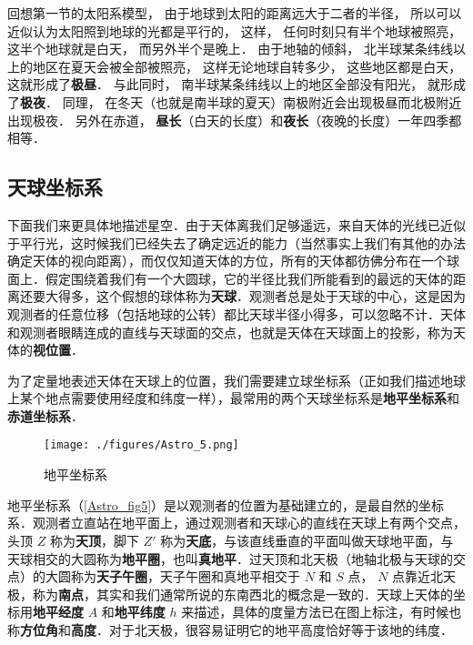回想第一节的太阳系模型， 由于地球到太阳的距离远大于二者的半径， 所以可以近似认为太阳照到地球的光都是平行的， %
这样， 任何时刻只有半个地球被照亮， 这半个地球就是白天， 而另外半个是晚上． 由于地轴的倾斜， 北半球某条纬线以上的地区在夏天会被全部被照亮， 这样无论地球自转多少， 这些地区都是白天， 这就形成了\textbf{极昼}． 与此同时， 南半球某条纬线以上的地区全部没有阳光， 就形成了\textbf{极夜}． 同理， 在冬天（也就是南半球的夏天）南极附近会出现极昼而北极附近出现极夜． 另外在赤道， \textbf{昼长}（白天的长度）和\textbf{夜长}（夜晚的长度）一年四季都相等．

\subsection{天球坐标系}

下面我们来更具体地描述星空．由于天体离我们足够遥远，来自天体的光线已近似于平行光，这时候我们已经失去了确定远近的能力（当然事实上我们有其他的办法确定天体的视向距离），而仅仅知道天体的方位，所有的天体都彷佛分布在一个球面上．假定围绕着我们有一个大圆球，它的半径比我们所能看到的最远的天体的距离还要大得多，这个假想的球体称为\textbf{天球}．观测者总是处于天球的中心，这是因为观测者的任意位移（包括地球的公转）都比天球半径小得多，可以忽略不计．天体和观测者眼睛连成的直线与天球面的交点，也就是天体在天球面上的投影，称为天体的\textbf{视位置}．

为了定量地表述天体在天球上的位置，我们需要建立球坐标系（正如我们描述地球上某个地点需要使用经度和纬度一样），最常用的两个天球坐标系是\textbf{地平坐标系}和\textbf{赤道坐标系}．

\begin{figure}[ht]
\centering
\texttt{[image: ./figures/Astro\_5.png]}
\caption{地平坐标系} \label{Astro_fig5}
\end{figure}

地平坐标系（\autoref{Astro_fig5}）是以观测者的位置为基础建立的，是最自然的坐标系．观测者立直站在地平面上，通过观测者和天球心的直线在天球上有两个交点，头顶 $Z$ 称为\textbf{天顶}，脚下 $Z'$ 称为\textbf{天底}，与该直线垂直的平面叫做天球地平面，与天球相交的大圆称为\textbf{地平圈}，也叫\textbf{真地平}．过天顶和北天极（地轴北极与天球的交点）的大圆称为\textbf{天子午圈}，天子午圈和真地平相交于 $N$ 和 $S$ 点， $N$ 点靠近北天极，称为\textbf{南点}，其实和我们通常所说的东南西北的概念是一致的．天球上天体的坐标用\textbf{地平经度} $A$ 和\textbf{地平纬度} $h$ 来描述，具体的度量方法已在图上标注，有时候也称\textbf{方位角}和\textbf{高度}．对于北天极，很容易证明它的地平高度恰好等于该地的纬度．

